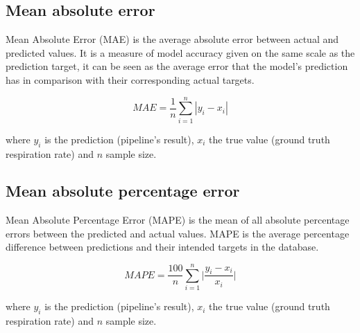 \subsection{Mean absolute error} \label{cap:mae}
Mean Absolute Error (MAE) is the average absolute error between actual and predicted values.  It is a measure of model accuracy given on the same scale as the prediction target, it can be seen as the average error that the model's prediction has in comparison with their corresponding actual targets.

\vspace{0.5cm}

$$MAE = \frac{1}{n} \sum_{i=1}^{n}|y_i-x_i|$$

\vspace{0.5cm}

where $y_i$ is the prediction (pipeline's result), $x_i$ the true value (ground truth respiration rate) and $n$ sample size.

\subsection {Mean absolute percentage error} \label{cap:mape}
Mean Absolute Percentage Error (MAPE) is the mean of all absolute percentage errors between the predicted and actual values.
MAPE is the average percentage difference between predictions and their intended targets in the database.
\vspace{0.5cm}

$$MAPE = \frac{100}{n} \sum_{i=1}^{n}\bigg | \frac{y_i-x_i}{x_i}\bigg |$$ 

\vspace{0.5cm}

where $y_i$ is the prediction (pipeline's result), $x_i$ the true value (ground truth respiration rate) and $n$ sample size.

 




